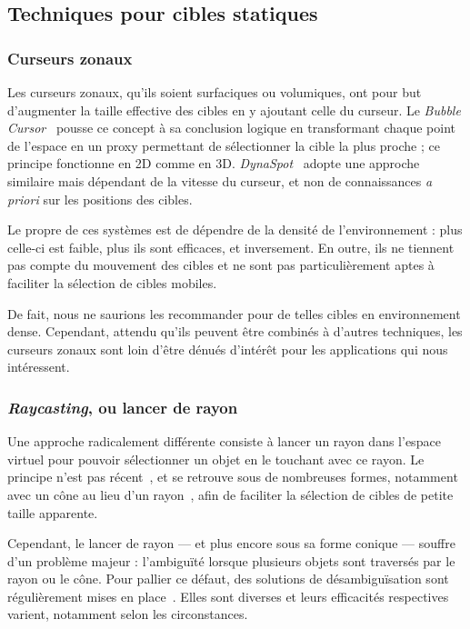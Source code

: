     \subsection{Techniques pour cibles statiques}
	\subsubsection{Curseurs zonaux}
    Les curseurs zonaux, qu'ils soient surfaciques ou volumiques, ont pour but d'augmenter la taille effective des cibles en y ajoutant celle du curseur. Le \emph{Bubble Cursor}~\cite{grossman2005bubble} pousse ce concept à sa conclusion logique en transformant chaque point de l'espace en un proxy permettant de sélectionner la cible la plus proche ; ce principe fonctionne en 2D comme en 3D. \emph{DynaSpot}~\cite{chapuis2009dynaspot} adopte une approche similaire mais dépendant de la vitesse du curseur, et non de connaissances \emph{a priori} sur les positions des cibles.
    
    Le propre de ces systèmes est de dépendre de la densité de l'environnement : plus celle-ci est faible, plus ils sont efficaces, et inversement. En outre, ils ne tiennent pas compte du mouvement des cibles et ne sont pas particulièrement aptes à faciliter la sélection de cibles mobiles.
    
    De fait, nous ne saurions les recommander pour de telles cibles en environnement dense. Cependant, attendu qu'ils peuvent être combinés à d'autres techniques, les curseurs zonaux sont loin d'être dénués d'intérêt pour les applications qui nous intéressent.
    
	\subsubsection{\emph{Raycasting}, ou lancer de rayon}
    Une approche radicalement différente consiste à lancer un rayon dans l'espace virtuel pour pouvoir sélectionner un objet en le \og touchant \fg{} avec ce rayon. Le principe n'est pas récent~\cite{liang1994jdcad}, et se retrouve sous de nombreuses formes, notamment avec un cône au lieu d'un rayon~\cite{steed20043d}, afin de faciliter la sélection de cibles de petite taille apparente.
    
    Cependant, le lancer de rayon --- et plus encore sous sa forme conique --- souffre d'un problème majeur : l'ambiguïté lorsque plusieurs objets sont traversés par le rayon ou le cône. Pour pallier ce défaut, des solutions de désambiguïsation sont régulièrement mises en place~\cite{grossman2006design}. Elles sont diverses et leurs efficacités respectives varient, notamment selon les circonstances.
    
